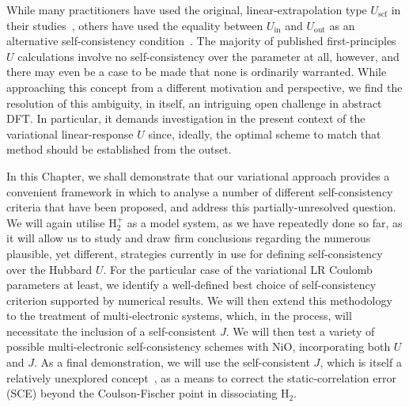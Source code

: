 While many practitioners have used the original, 
linear-extrapolation type $U_\textrm{scf}$
in their studies~\cite{kulik2008self,:/content/aip/journal/jcp/133/11/10.1063/1.3489110,doi:10.1021/jp070549l,2053-1591-3-8-086104,Youmbi20141,doi:10.1021/acs.jctc.6b00937,PhysRevB.78.241201,PhysRevLett.105.146405,doi:10.1021/jp1041316,Hsu201019,PhysRevB.80.075102}, 
others have used the equality between  
$U_\textrm{in}$ and $U_\textrm{out}$ 
as an alternative self-consistency condition~\cite{doi:10.1021/jp070549l,0953-8984-22-5-055602,PhysRevB.84.115108,PhysRevB.93.085135,PhysRevLett.106.118501,doi:10.1063/1.4947240,PhysRevB.85.045132}.
%
The majority of published first-principles $U$ calculations 
involve no self-consistency over the  parameter at all, however, and there may 
even be a case to be made that none is ordinarily warranted. 
%
While approaching this concept  
from a different motivation and perspective, 
we find the resolution of this ambiguity, in itself, 
an intriguing open challenge in abstract DFT.
% 
In particular, 
it demands investigation in the present context of
the variational linear-response $U$ since, ideally, 
the optimal scheme to match that method 
should be established from the outset.

In this Chapter, 
we shall demonstrate that our variational approach 
provides a convenient  framework in which to analyse 
a number of different self-consistency criteria that have been proposed, 
and address this partially-unresolved question. 
%
We will again utilise H$_2^+$ as a model system, 
as we have repeatedly done so far, 
as it will allow us to study and draw firm conclusions 
regarding the numerous plausible, yet different, strategies 
currently in use for defining self-consistency over the Hubbard $U$.
%
For the particular case of the variational LR 
Coulomb parameters at least, 
we identify a well-defined best choice of self-consistency criterion  
supported by numerical results.
%
We will then extend this methodology to 
the treatment of multi-electronic systems, 
which, in the process, will necessitate the inclusion of a self-consistent $J$.
%
We will then test a variety of possible 
multi-electronic self-consistency schemes with NiO, 
incorporating both $U$ and $J$.
%
As a final demonstration, 
we will use the self-consistent $J$, 
which is itself a relatively unexplored concept~\cite{PhysRevB.85.045132}, 
as a means to correct the static-correlation error (SCE)  
beyond the Coulson-Fischer point in dissociating H$_2$.


